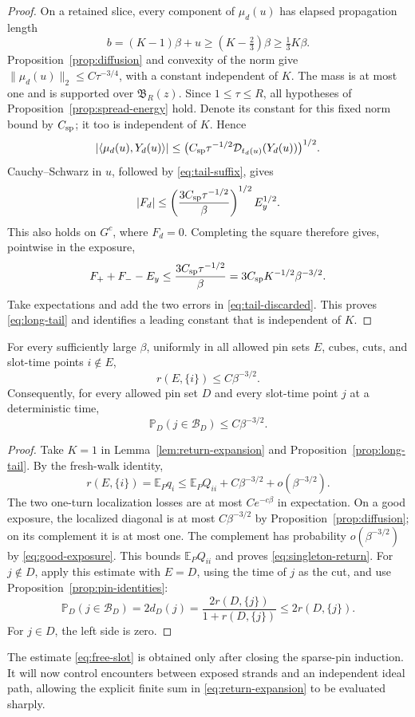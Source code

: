 \begin{proof}
On a retained slice, every component of \(\mu_d(u)\) has elapsed
propagation length
\[
 b=(K-1)\beta+u\ge(K-\tfrac23)\beta\ge\tfrac13K\beta.
\]
Proposition~\ref{prop:diffusion} and convexity of the norm give
\(\|\mu_d(u)\|_2\le C\tau^{-3/4}\), with a constant independent
of \(K\). The mass is at most one and is supported over
\(\mathfrak B_R(z)\). Since \(1\le\tau\le R\), all hypotheses of
Proposition~\ref{prop:spread-energy} hold. Denote its constant for
this fixed norm bound by \(C_{\rm sp}\); it too is independent of
\(K\). Hence
\[
 |\langle\mu_d(u),Y_d(u)\rangle|
 \le\bigl(C_{\rm sp}\tau^{-1/2}
             \mathcal D_{t_d(u)}(Y_d(u))\bigr)^{1/2}.
\]
Cauchy--Schwarz in \(u\), followed by \eqref{eq:tail-suffix}, gives
\[
 |F_d|\le
 \left(\frac{3C_{\rm sp}\tau^{-1/2}}{\beta}\right)^{1/2}E_y^{1/2}.
\]
This also holds on \(G^c\), where \(F_d=0\). Completing the square
therefore gives, pointwise in the exposure,
\[
 F_++F_--E_y
 \le\frac{3C_{\rm sp}\tau^{-1/2}}{\beta}
 =3C_{\rm sp}K^{-1/2}\beta^{-3/2}.
\]
Take expectations and add the two errors in
\eqref{eq:tail-discarded}. This proves \eqref{eq:long-tail} and
identifies a leading constant that is independent of \(K\).
\end{proof}

\begin{corollary}\label{cor:singleton-bound}
For every sufficiently large \(\beta\), uniformly in all allowed
pin sets \(E\), cubes, cuts, and slot-time points \(i\notin E\),
\begin{equation}\label{eq:singleton-return}
 r(E,\{i\})\le C\beta^{-3/2}.
\end{equation}
Consequently, for every allowed pin set \(D\) and every slot-time
point \(j\) at a deterministic time,
\begin{equation}\label{eq:free-slot}
 \mathbb P_D(j\in\mathcal B_D)\le C\beta^{-3/2}.
\end{equation}
\end{corollary}

\begin{proof}
Take \(K=1\) in Lemma~\ref{lem:return-expansion} and
Proposition~\ref{prop:long-tail}. By the fresh-walk identity,
\[
 r(E,\{i\})=\mathbb E_Pq_i
 \le\mathbb E_P Q_{ii}+C\beta^{-3/2}+o(\beta^{-3/2}).
\]
The two one-turn localization losses are at most \(Ce^{-c\beta}\)
in expectation. On a good exposure, the localized diagonal is at most
\(C\beta^{-3/2}\) by Proposition~\ref{prop:diffusion}; on its
complement it is at most one. The complement has probability
\(o(\beta^{-3/2})\) by \eqref{eq:good-exposure}. This bounds
\(\mathbb E_PQ_{ii}\) and proves \eqref{eq:singleton-return}.
For \(j\notin D\), apply this estimate with \(E=D\), using the time
of \(j\) as the cut, and use Proposition~\ref{prop:pin-identities}:
\[
 \mathbb P_D(j\in\mathcal B_D)=2d_D(j)
 =\frac{2r(D,\{j\})}{1+r(D,\{j\})}
 \le2r(D,\{j\}).
\]
For \(j\in D\), the left side is zero.
\end{proof}

The estimate \eqref{eq:free-slot} is obtained only after closing the
sparse-pin induction. It will now control encounters between exposed
strands and an independent ideal path, allowing the explicit finite
sum in \eqref{eq:return-expansion} to be evaluated sharply.
